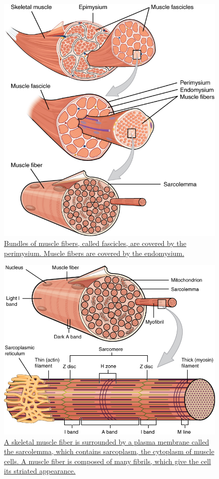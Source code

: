 \begin{figure}

{\centering \includegraphics[width=0.7\linewidth]{./figures/locomotion/1007_Muscle_Fibes_(large)} 

}

\caption{\href{https://upload.wikimedia.org/wikipedia/commons/d/dd/1007_Muscle_Fibes_\%28large\%29.jpg}{Bundles of muscle fibers, called fascicles, are covered by the perimysium. Muscle fibers are covered by the endomysium.}}\label{fig:skeletalmuscle}
\end{figure}



\begin{figure}

{\centering \includegraphics[width=0.7\linewidth]{./figures/locomotion/1022_Muscle_Fibers_(small)} 

}

\caption{\href{https://commons.wikimedia.org/wiki/File:1022_Muscle_Fibers_(small).jpg}{A skeletal muscle fiber is surrounded by a plasma membrane called the sarcolemma, which contains sarcoplasm, the cytoplasm of muscle cells. A muscle fiber is composed of many fibrils, which give the cell its striated appearance.}}\label{fig:musclefibre}
\end{figure}

